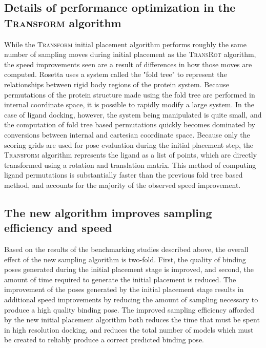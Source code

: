 \subsection{Details of performance optimization in the \textsc{Transform} algorithm}
While the \textsc{Transform} initial placement algorithm performs roughly the same number of sampling moves during initial placement as the \textsc{TransRot} algorithm, the speed improvements seen are a result of differences in how those moves are computed.
Rosetta uses a system called the "fold tree" to represent the relationships between rigid body regions of the protein system\citep{Davis:2009bf,Das:2008gf}.
Because permutations of the protein structure made using the fold tree are performed in internal coordinate space, it is possible to rapidly modify a large system.
In the case of ligand docking, however, the system being manipulated is quite small, and the computation of fold tree based permutations quickly becomes dominated by conversions between internal and cartesian coordinate space.
Because only the scoring grids are used for pose evaluation during the initial placement step, the \textsc{Transform} algorithm represents the ligand as a list of points, which are directly transformed using a rotation and translation matrix.
This method of computing ligand permutations is substantially faster than the previous fold tree based method, and accounts for the majority of the observed speed improvement.

\subsection{The new algorithm improves sampling efficiency and speed}
Based on the results of the benchmarking studies described above, the overall effect of the new sampling algorithm is two-fold.
First, the quality of binding poses generated during the initial placement stage is improved, and second, the amount of time required to generate the initial placement is reduced.
The improvement of the poses generated by the initial placement stage results in additional speed improvements by reducing the amount of sampling necessary to produce a high quality binding pose.
The improved sampling efficiency afforded by the new initial placement algorithm both reduces the time that must be spent in high resolution docking, and reduces the total number of models which must be created to reliably produce a correct predicted binding pose.

